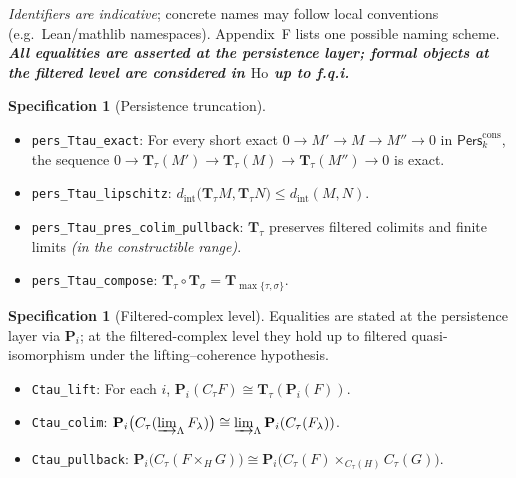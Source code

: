 \documentclass[11pt]{article}
\DeclareRobustCommand{\hyp}{\nobreakdash-}
\numberwithin{equation}{section}
\theoremstyle{definition}
\newtheorem{specification}[theorem]{Specification}
\begin{document}
\noindent\emph{Identifiers are indicative}; concrete names may follow local conventions (e.g.\ Lean/mathlib namespaces). Appendix~F lists one possible naming scheme. \emph{\textbf{All equalities are asserted at the persistence layer; formal objects at the filtered level are considered in $\mathrm{Ho}$ up to f.q.i.}} 

\begin{specification}[Persistence truncation]\label{spec:pers-Ttau}
\begin{itemize}
  \item \texttt{pers\_Ttau\_exact}: For every short exact $0\to M'\to M\to M''\to 0$ in $\mathsf{Pers}^{\mathrm{cons}}_k$, the sequence $0\to \mathbf{T}_\tau(M')\to \mathbf{T}_\tau(M)\to \mathbf{T}_\tau(M'')\to 0$ is exact.
  \item \texttt{pers\_Ttau\_lipschitz}: $d_{\mathrm{int}}\!\big(\mathbf{T}_\tau M,\mathbf{T}_\tau N\big)\le d_{\mathrm{int}}(M,N)$.
  \item \texttt{pers\_Ttau\_pres\_colim\_pullback}: $\mathbf{T}_\tau$ preserves filtered colimits and finite limits \emph{(in the constructible range)}.
  \item \texttt{pers\_Ttau\_compose}: $\mathbf{T}_\tau\circ \mathbf{T}_\sigma=\mathbf{T}_{\max\{\tau,\sigma\}}$.
\end{itemize}
\end{specification}

\begin{specification}[Filtered\hyp complex level]\label{spec:filtered-level}
Equalities are stated at the persistence layer via $\mathbf{P}_i$; at the filtered\hyp complex level they hold up to filtered quasi\hyp isomorphism under the lifting–coherence hypothesis.
\begin{itemize}
  \item \texttt{Ctau\_lift}: For each $i$, $\mathbf{P}_i(C_\tau F)\cong \mathbf{T}_\tau(\mathbf{P}_i(F))$.
  \item \texttt{Ctau\_colim}: $\mathbf{P}_i\big(C_\tau(\varinjlim_\Lambda F_\lambda)\big)\cong \varinjlim_\Lambda \mathbf{P}_i(C_\tau(F_\lambda))$.
  \item \texttt{Ctau\_pullback}: $\mathbf{P}_i\big(C_\tau(F\times_H G)\big)\cong \mathbf{P}_i\big(C_\tau(F)\times_{C_\tau(H)}C_\tau(G)\big)$.
\end{itemize}
\end{specification}
\end{document}

